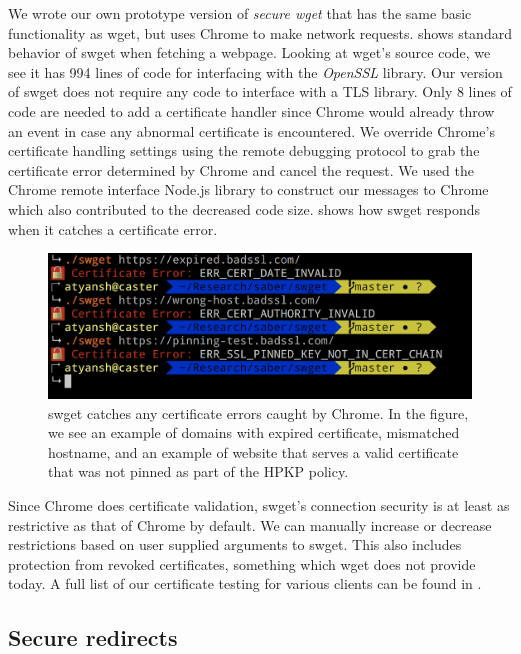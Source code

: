 We wrote our own prototype version of \emph{secure wget} that has the same
basic functionality as wget, but uses Chrome to make network requests.
 shows standard behavior of swget when fetching a
webpage. Looking at wget's source code, we see it has 994 lines of code for
interfacing with the \emph{OpenSSL} library. Our version of swget does not
require any code to interface with a TLS library. Only 8 lines of code are
needed to add a certificate handler since Chrome would already throw an event
in case any abnormal certificate is encountered. We override Chrome's
certificate handling settings using the remote debugging protocol to grab the
certificate error determined by Chrome and cancel the request. We used the
Chrome remote interface Node.js library to construct our messages to Chrome
which also contributed to the decreased code size. 
shows how swget responds when it catches a certificate error.

\begin{figure}[h]
  \includegraphics[width=\textwidth]{figures/cert-error}
  \caption[Behavior on certificate errors]{swget catches any certificate errors
  caught by Chrome. In the figure, we see an example of domains with expired
  certificate, mismatched hostname, and an example of website that serves a
  valid certificate that was not pinned as part of the HPKP policy.} 
  \label{fig:cert-error-saber}
\end{figure}


Since Chrome does certificate validation, swget's connection security is at
least as restrictive as that of Chrome by default. We can manually increase or
decrease restrictions based on user supplied arguments to swget. This also
includes protection from revoked certificates, something which wget does not
provide today. A full list of our certificate testing for various clients can
be found in .
\subsection{Secure redirects}

